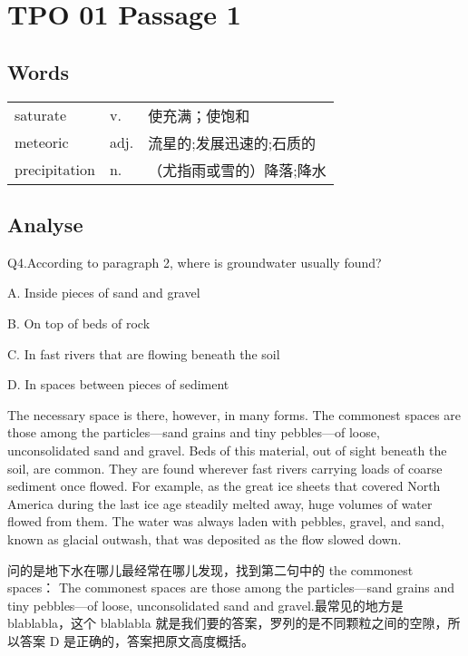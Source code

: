 \section{TPO 01 Passage 1}

\subsection{Words}

\begin{tabular}{lll}

  saturate      & v.   & 使充满；使饱和       \\
  meteoric      & adj. & 流星的;发展迅速的;石质的 \\
  precipitation & n.   & （尤指雨或雪的）降落;降水 \\
\end{tabular}

\subsection{Analyse}

\begin{blk}
  \begin{qst}
    Q4.According to paragraph 2, where is groundwater usually found?
  \end{qst}

  \begin{chc}
    A. Inside pieces of sand and gravel

    B. On top of beds of rock

    C. In fast rivers that are flowing beneath the soil

    D. In spaces between pieces of sediment
  \end{chc}

  \begin{psgq}
    The necessary space is there, however, in many forms. The commonest spaces are those among the particles—sand grains and tiny pebbles—of loose, unconsolidated sand and gravel. Beds of this material, out of sight beneath the soil, are common. They are found wherever fast rivers carrying loads of coarse sediment once flowed. For example, as the great ice sheets that covered North America during the last ice age steadily melted away, huge volumes of water flowed from them. The water was always laden with pebbles, gravel, and sand, known as glacial outwash, that was deposited as the flow slowed down.
  \end{psgq}

  \begin{nlz}
    问的是地下水在哪儿最经常在哪儿发现，找到第二句中的 the commonest spaces： The commonest spaces are those among the particles—sand grains and tiny pebbles—of loose, unconsolidated sand and gravel.最常见的地方是 blablabla，这个 blablabla 就是我们要的答案，罗列的是不同颗粒之间的空隙，所以答案 D 是正确的，答案把原文高度概括。
  \end{nlz}
\end{blk}

